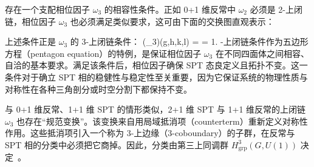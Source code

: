 存在一个支配相位因子 $\omega_3$ 的相容性条件。正如 0+1 维反常中 $\omega_2$ 必须是 2-上闭链，相位因子 $\omega_3$ 也必须满足类似要求，这可由下面的交换图直观表示：
\begin{center}
\end{center}
上述条件正是 $\omega_3$ 的 3-上闭链条件：
\be
(\dd \omega_3)(g,h,k,l) =  = 1.
-上闭链条件作为五边形方程（pentagon equation）的特例，是保证相位因子 $\omega_3$ 在不同四面体之间相容、自洽的基本要求。满足该条件后，相位因子确保 SPT 态良定义且拓扑不变。这一条件对于确立 SPT 相的稳健性与稳定性至关重要，因为它保证系统的物理性质与对称性在各种三角剖分或时空分割下都保持不变。

与 0+1 维反常、1+1 维 SPT 的情形类似，2+1 维 SPT 与 1+1 维反常的上闭链 $\omega_3$ 也存在“规范变换”。该变换来自用局域抵消项（counterterm）重新定义对称性作用。这些抵消项引入一个称为 3-上边缘（3-coboundary）的子群，在反常与 SPT 相的分类中必须把它商掉。因此，分类由第三上同调群 $H_{\mathrm{grp}}^3(G,U(1))$ 决定~\cite{chen2012symmetry,chen2013symmetry}。
